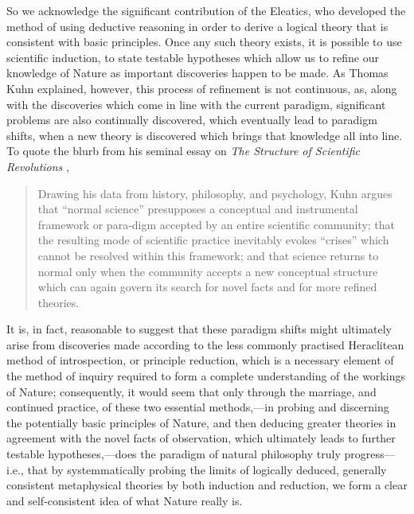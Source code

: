 So we acknowledge the significant contribution of the Eleatics, who developed the method of using deductive reasoning in order to derive a logical theory that is consistent with basic principles. Once any such theory exists, it is possible to use scientific induction, to state testable hypotheses which allow us to refine our knowledge of Nature as important discoveries happen to be made. As Thomas Kuhn explained, however, this process of refinement is not continuous, as, along with the discoveries which come in line with the current paradigm, significant problems are also continually discovered, which eventually lead to paradigm shifts, when a new theory is discovered which brings that knowledge all into line. To quote the blurb from his seminal essay on \textit{The Structure of Scientific Revolutions} \cite{Kuhn1962},
\begin{quote}
Drawing his data from history, philosophy, and psychology, Kuhn argues that ``normal science'' presupposes a conceptual and instrumental framework or para-digm accepted by an entire scientific community; that the resulting mode of scientific practice inevitably evokes ``crises'' which cannot be resolved within this framework; and that science returns to normal only when the community accepts a new conceptual structure which can again govern its search for novel facts and for more refined theories.
\end{quote}

It is, in fact, reasonable to suggest that these paradigm shifts might ultimately arise from discoveries made according to the less commonly practised Heraclitean method of introspection, or principle reduction, which is a necessary element of the method of inquiry required to form a complete understanding of the workings of Nature; consequently, it would seem that only through the marriage, and continued practice, of these two essential methods,---in probing and discerning the potentially basic principles of Nature, and then deducing greater theories in agreement with the novel facts of observation, which ultimately leads to further testable hypotheses,---does the paradigm of natural philosophy truly progress---i.e., that by systemmatically probing the limits of logically deduced, generally consistent metaphysical theories by both induction and reduction, we form a clear and self-consistent idea of what Nature really is.

